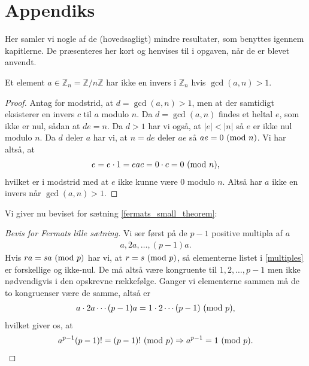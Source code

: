 \appendix
\chapter{Appendiks}
Her samler vi nogle af de (hovedsagligt) mindre resultater, som benyttes igennem kapitlerne. De præsenteres her kort og henvises til  i opgaven, når de er blevet anvendt.

\begin{proposition}
\label{inverse_exists_not}
Et element $a \in \mathbb{Z}_n = \mathbb{Z}/n\mathbb{Z}$ har ikke en invers i $\mathbb{Z}_n$ hvis $\gcd(a, n) > 1$. 
\end{proposition}
\begin{proof}
Antag for modstrid, at $d = \gcd(a, n) > 1$, men at der samtidigt eksisterer en invers $c$ til $a$ modulo $n$. Da $d = \gcd(a, n)$ findes et heltal $e$, som ikke er nul, sådan at $de = n$. Da $d >1$ har vi også, at $|e| < |n|$ så $e$ er ikke nul modulo $n$. Da $d$ deler $a$ har vi, at $n = de$ deler $ae$ så $ae = 0 \ (\mathrm{mod} \ n)$. Vi har altså, at
\begin{align*}
	e = e \cdot 1 = eac = 0 \cdot c = 0 \ (\mathrm{mod} \ n),
\end{align*}
hvilket er i modstrid med at $e$ ikke kunne være $0$ modulo $n$. Altså har $a$ ikke en invers når $\gcd(a, n) > 1$.
\end{proof}

Vi giver nu beviset for sætning \ref{fermats_small_theorem}:
\begin{proof}[Bevis for Fermats lille sætning]
Vi ser først på de $p-1$ positive multipla af $a$
\begin{align}
	\label{multiples}
	a, 2a, \ldots, (p-1)a.
\end{align}
Hvis $ra = sa \ (\mathrm{mod} \ p)$ har vi, at $r = s \ (\mathrm{mod} \ p)$, så elementerne listet i \eqref{multiples} er forskellige og ikke-nul. De må altså være kongruente til $1, 2, \ldots, p-1$ men ikke nødvendigvis i den opskrevne rækkefølge. Ganger vi elementerne sammen må de to kongruenser være de samme, altså er
\begin{align*}
	a \cdot 2a \cdots (p-1)a = 1 \cdot 2 \cdots (p-1) \ (\mathrm{mod} \ p),
\end{align*}
hvilket giver os, at 
\begin{align*}
	a^{p-1} (p-1)! = (p-1)! \ (\mathrm{mod} \ p) \Rightarrow a^{p-1} = 1 \ (\mathrm{mod} \ p).
\end{align*}


\end{proof}